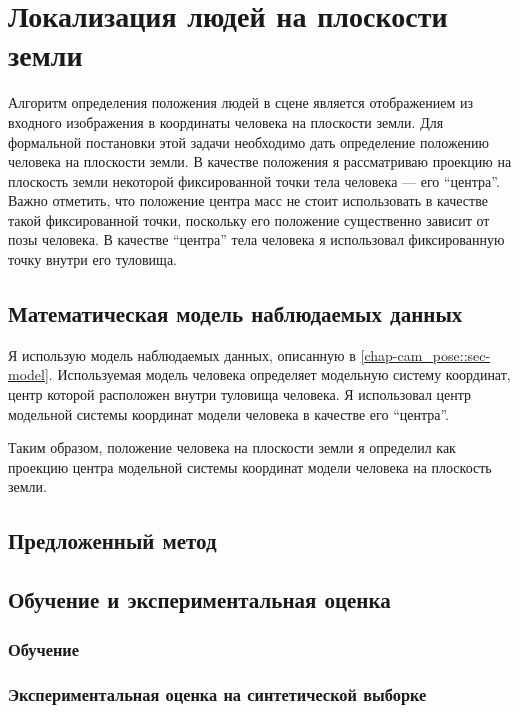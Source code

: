 \chapter{Локализация людей на плоскости земли} \label{chapt4}

Алгоритм определения положения людей в сцене является отображением из входного изображения в координаты человека на плоскости земли. Для формальной постановки этой задачи необходимо дать определение положению человека на плоскости земли. В качестве положения я рассматриваю проекцию на плоскость земли некоторой фиксированной точки тела человека --- его ``центра''. Важно отметить, что положение центра масс не стоит использовать в качестве такой фиксированной точки, поскольку его положение существенно зависит от позы человека. В качестве ``центра'' тела человека я использовал фиксированную точку внутри его туловища.

\section{Математическая модель наблюдаемых данных}

Я использую модель наблюдаемых данных, описанную в \ref{chap-cam_pose::sec-model}. Используемая модель человека \cite{pishchulin15arxiv} определяет модельную систему координат, центр которой расположен внутри туловища человека. Я использовал центр модельной системы координат модели человека в качестве его ``центра''.

Таким образом, положение человека на плоскости земли я определил как проекцию центра модельной системы координат модели человека на плоскость земли.

\section{Предложенный метод}

\section{Обучение и экспериментальная оценка}
\subsection{Обучение}
\subsection{Экспериментальная оценка на синтетической выборке}
